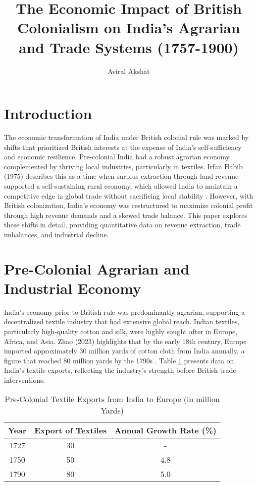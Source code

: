 \documentclass[9pt,twocolumn,twoside]{opticajnl}
\title{The Economic Impact of British Colonialism on India’s Agrarian and Trade Systems (1757-1900)}}
\author[1]{Aviral Akshat}
\affil[1]{Indian Institute of Technology, Delhi, Hauz Khas, New Delhi, India 110016.}
\begin{document}
\maketitle

\section{Introduction}
The economic transformation of India under British colonial rule was marked by shifts that prioritized British interests at the expense of India’s self-sufficiency and economic resilience. Pre-colonial India had a robust agrarian economy complemented by thriving local industries, particularly in textiles. Irfan Habib (1975) describes this as a time when surplus extraction through land revenue supported a self-sustaining rural economy, which allowed India to maintain a competitive edge in global trade without sacrificing local stability \cite{habib1975colonization}. However, with British colonization, India’s economy was restructured to maximize colonial profit through high revenue demands and a skewed trade balance. This paper explores these shifts in detail, providing quantitative data on revenue extraction, trade imbalances, and industrial decline.

\section{Pre-Colonial Agrarian and Industrial Economy}
India’s economy prior to British rule was predominantly agrarian, supporting a decentralized textile industry that had extensive global reach. Indian textiles, particularly high-quality cotton and silk, were highly sought after in Europe, Africa, and Asia. Zhao (2023) highlights that by the early 18th century, Europe imported approximately 30 million yards of cotton cloth from India annually, a figure that reached 80 million yards by the 1790s \cite{zhao2023colonialism}. Table \ref{table:pre_colonial_exports} presents data on India's textile exports, reflecting the industry’s strength before British trade interventions.

\begin{table}[h!]

\begin{tabular}{|c|c|c|}
\hline
\centering
\textbf{Year} & \textbf{Export of Textiles} & \textbf{Annual Growth Rate (\%)} \\
\hline
1727 & 30 & - \\
1750 & 50 & 4.8 \\
1790 & 80 & 5.0 \\
\hline
\end{tabular}
\caption{Pre-Colonial Textile Exports from India to Europe (in million Yards)}
\label{table:pre_colonial_exports}
\end{table}
\end{document}
